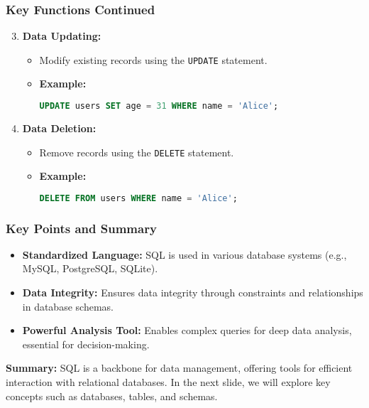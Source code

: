 \documentclass{beamer}
\begin{document}
\begin{frame}[fragile]
    \frametitle{Key Functions Continued}
    \begin{enumerate}
        \setcounter{enumi}{2} %
        \item \textbf{Data Updating:}
        \begin{itemize}
            \item Modify existing records using the \texttt{UPDATE} statement.
            \item \textbf{Example:}
            \begin{lstlisting}[language=SQL]
UPDATE users SET age = 31 WHERE name = 'Alice';
            \end{lstlisting}
        \end{itemize}

        \item \textbf{Data Deletion:}
        \begin{itemize}
            \item Remove records using the \texttt{DELETE} statement.
            \item \textbf{Example:}
            \begin{lstlisting}[language=SQL]
DELETE FROM users WHERE name = 'Alice';
            \end{lstlisting}
        \end{itemize}
    \end{enumerate}
\end{frame}

\begin{frame}[fragile]
    \frametitle{Key Points and Summary}
    \begin{itemize}
        \item \textbf{Standardized Language:} 
        SQL is used in various database systems (e.g., MySQL, PostgreSQL, SQLite).
        \item \textbf{Data Integrity:} 
        Ensures data integrity through constraints and relationships in database schemas.
        \item \textbf{Powerful Analysis Tool:} 
        Enables complex queries for deep data analysis, essential for decision-making.
    \end{itemize}
    
    \textbf{Summary:} SQL is a backbone for data management, offering tools for efficient interaction with relational databases. In the next slide, we will explore key concepts such as databases, tables, and schemas.
\end{frame}
\end{document}
